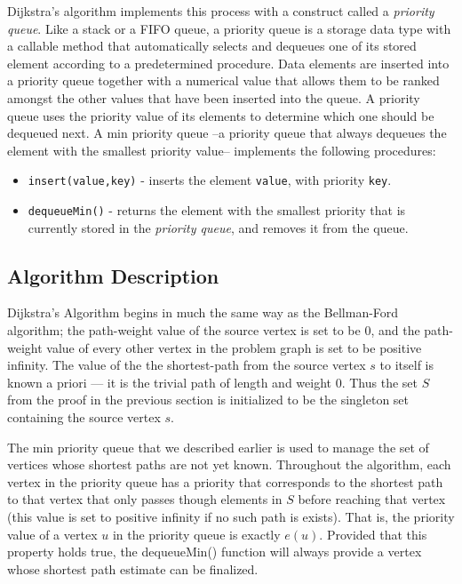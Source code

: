 \documentclass[12pt,twoside]{reedthesis}
\newcommand{\procedure}[1]{{\tt#1}}
\newcommand{\var}[1]{{\mbox{\tt#1}}}
\newcommand{\im}[1]{{\em#1}}
\begin{document}
Dijkstra's algorithm implements this process with a construct called a \im{priority queue}. Like a stack or a FIFO queue, a priority queue is a storage data type with a callable method that automatically selects and dequeues one of its stored element according to a predetermined procedure. Data elements are inserted into a priority queue together with a numerical value that allows them to be ranked amongst the other values that have been inserted into the queue. A priority queue uses the priority value of its elements to determine which one should be dequeued next. A min priority queue --a priority queue that always dequeues the element with the smallest priority value-- implements the following procedures:

\begin{itemize}

\item \procedure{insert(value,key)} - inserts the element \var{value}, with priority \var{key}.

\item \procedure{dequeueMin()} - returns the element with the smallest priority that is currently stored in the \im{priority queue}, and removes it from the queue.

\end{itemize}

\subsection{Algorithm Description}

Dijkstra's Algorithm begins in much the same way as the Bellman-Ford algorithm; the path-weight value of the source vertex is set to be 0, and the path-weight value of every other vertex in the problem graph is set to be positive infinity. The value of the the shortest-path from the source vertex $s$ to itself is known a priori --- it is the trivial path of length and weight 0. Thus the set $S$ from the proof in the previous section is initialized to be the singleton set containing the source vertex $s$.

The min priority queue that we described earlier is used to manage the set of vertices whose shortest paths are not yet known. Throughout the algorithm, each vertex in the priority queue has a priority that corresponds to the shortest path to that vertex that only passes though elements in $S$ before reaching that vertex (this value is set to positive infinity if no such path is exists). That is, the priority value of a vertex $u$ in the priority queue is exactly $e(u)$. Provided that this property holds true, the dequeueMin() function will always provide a vertex whose shortest path estimate can be finalized.
\end{document}
